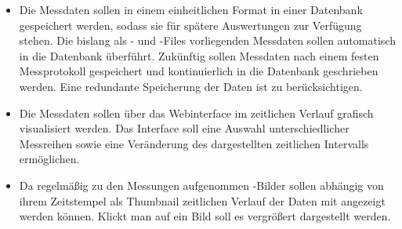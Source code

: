 \begin{itemize}

\item Die Messdaten sollen in einem einheitlichen Format in einer Datenbank gespeichert werden, sodass sie für spätere Auswertungen zur Verfügung stehen. Die bislang als - und -Files vorliegenden Messdaten sollen automatisch in die Datenbank überführt. Zukünftig sollen Messdaten nach einem festen Messprotokoll gespeichert und kontinuierlich in die Datenbank geschrieben werden. Eine redundante Speicherung der Daten ist zu berücksichtigen.

\item Die Messdaten sollen über das Webinterface im zeitlichen Verlauf grafisch visualisiert werden. Das Interface soll eine Auswahl unterschiedlicher Messreihen sowie eine Veränderung des dargestellten zeitlichen Intervalls ermöglichen.

\item Da regelmäßig zu den Messungen aufgenommen -Bilder sollen abhängig von ihrem Zeitstempel als Thumbnail zeitlichen Verlauf der Daten mit angezeigt werden können. Klickt man auf ein Bild soll es vergrößert dargestellt werden.

\end{itemize}
